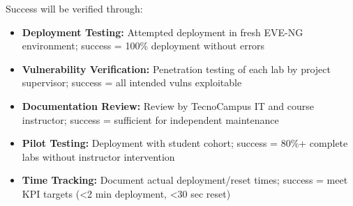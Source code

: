 Success will be verified through:

\begin{itemize}
    \item \textbf{Deployment Testing:} Attempted deployment in fresh EVE-NG environment; success = 100\% deployment without errors
    \item \textbf{Vulnerability Verification:} Penetration testing of each lab by project supervisor; success = all intended vulns exploitable
    \item \textbf{Documentation Review:} Review by TecnoCampus IT and course instructor; success = sufficient for independent maintenance
    \item \textbf{Pilot Testing:} Deployment with student cohort; success = 80\%+ complete labs without instructor intervention
    \item \textbf{Time Tracking:} Document actual deployment/reset times; success = meet KPI targets (<2 min deployment, <30 sec reset)
\end{itemize}

